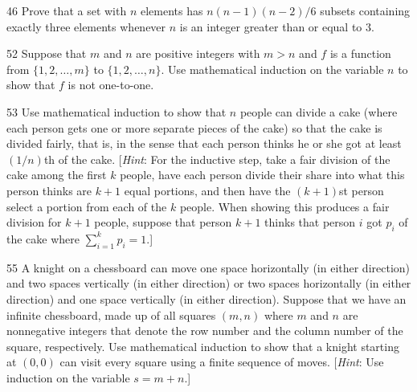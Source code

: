 \documentclass[11pt]{article}
\begin{document}
\begin{exercise}{46}
    Prove that a set with $n$ elements has $n(n-1)(n-2)/6$ subsets
    containing exactly three elements whenever $n$ is an integer
    greater than or equal to $3$.
\end{exercise}

\begin{exercise}{52}
    Suppose that $m$ and $n$ are positive integers with $m > n$ and
    $f$ is a function from $\{1, 2, \dots, m\}$ to $\{1, 2, \dots, n\}$.
    Use mathematical induction on the variable $n$ to show that $f$ is
    not one-to-one.
\end{exercise}

\begin{exercise}{53}
    Use mathematical induction to show that $n$ people can divide a
    cake (where each person gets one or more separate pieces of the
    cake) so that the cake is divided fairly, that is, in the sense
    that each person thinks he or she got at least $(1/n)$th of the
    cake.
    [\emph{Hint}: For the inductive step, take a fair division of the
    cake among the first $k$ people, have each person divide their
    share into what this person thinks are $k+1$ equal portions, and
    then have the $(k+1)$st person select a portion from each of the
    $k$ people. When showing this produces a fair division for $k+1$
    people, suppose that person $k+1$ thinks that person $i$ got
    $p_i$ of the cake where $\sum_{i=1}^{k} p_i = 1$.]
\end{exercise}

\begin{exercise}{55}
    A knight on a chessboard can move one space horizontally (in
    either direction) and two spaces vertically (in either direction)
    or two spaces horizontally (in either direction) and one space
    vertically (in either direction). Suppose that we have an infinite
    chessboard, made up of all squares $(m, n)$ where $m$ and $n$ are
    nonnegative integers that denote the row number and the column
    number of the square, respectively. Use mathematical induction to
    show that a knight starting at $(0,0)$ can visit every square
    using a finite sequence of moves.
    [\emph{Hint}: Use induction on the variable $s = m + n$.]
\end{exercise}
\end{document}
